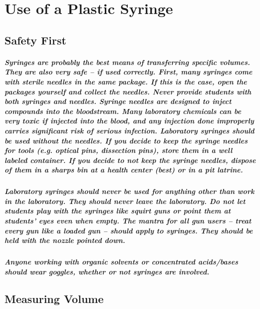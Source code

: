 \chapter{Use of a Plastic Syringe}

\section{Safety First}

\paragraph{Syringes are probably the best means of transferring specific volumes. They are also very safe – if used correctly. First, many syringes come with sterile needles in the same package. If this is the case, open the packages yourself and collect the needles. Never provide students with both syringes and needles. Syringe needles are designed to inject compounds into the bloodstream. Many laboratory chemicals can be very toxic if injected into the blood, and any injection done improperly carries significant risk of serious infection. Laboratory syringes should be used without the needles. If you decide to keep the syringe needles for tools (e.g. optical pins, dissection pins), store them in a well labeled container. If you decide to not keep the syringe needles, dispose of them in a sharps bin at a health center (best) or in a pit latrine.}

\paragraph{Laboratory syringes should never be used for anything other than work in the laboratory. They should never leave the laboratory. Do not let students play with the syringes like squirt guns or point them at students’ eyes even when empty. The mantra for all gun users – treat every gun like a loaded gun – should apply to syringes. They should be held with the nozzle pointed down.}

\paragraph{Anyone working with organic solvents or concentrated acids/bases should wear goggles, whether or not syringes are involved.}

\section{Measuring Volume}

